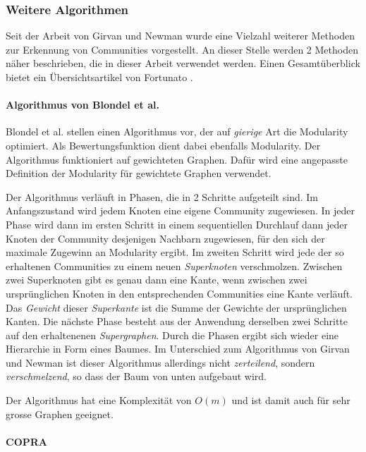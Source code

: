 \subsubsection{Weitere Algorithmen}
\label{sec:algorithmen}

Seit der Arbeit von Girvan und Newman wurde eine Vielzahl weiterer
Methoden zur Erkennung von Communities vorgestellt. An dieser Stelle
werden 2 Methoden n\"aher beschrieben, die in dieser Arbeit verwendet
werden. Einen Gesamt\"uberblick bietet ein \"Ubersichtsartikel von
Fortunato \cite{Fortunato2010}.

\paragraph{Algorithmus von Blondel et al.}
\label{sec:algor-von-blond}

Blondel et al.\cite{Blondel2008} stellen einen Algorithmus vor, der
auf \emph{gierige} Art die Modularity optimiert.  Als
Bewertungsfunktion dient dabei ebenfalls Modularity. Der Algorithmus
funktioniert auf gewichteten Graphen. Daf\"ur wird eine angepasste
Definition der Modularity f\"ur gewichtete Graphen
verwendet\cite{Newman2004a}.

Der Algorithmus verl\"auft in Phasen, die in 2 Schritte aufgeteilt
sind. Im Anfangszustand wird jedem Knoten eine eigene Community
zugewiesen. In jeder Phase wird dann im ersten Schritt in einem
sequentiellen Durchlauf dann jeder Knoten der Community desjenigen
Nachbarn zugewiesen, f\"ur den sich der maximale Zugewinn an
Modularity ergibt. Im zweiten Schritt wird jede der so erhaltenen
Communities zu einem neuen \emph{Superknoten} verschmolzen. Zwischen
zwei Superknoten gibt es genau dann eine Kante, wenn zwischen zwei
urspr\"unglichen Knoten in den entsprechenden Communities eine Kante
verl\"auft. Das \emph{Gewicht} dieser \emph{Superkante} ist die Summe
der Gewichte der urspr\"unglichen Kanten. Die n\"achste Phase besteht
aus der Anwendung derselben zwei Schritte auf den erhaltenenen
\emph{Supergraphen}. Durch die Phasen ergibt sich wieder eine
Hierarchie in Form eines Baumes. Im Unterschied zum Algorithmus von
Girvan und Newman ist dieser Algorithmus allerdings nicht
\emph{zerteilend}, sondern \emph{verschmelzend}, so dass der Baum von
unten aufgebaut wird.

Der Algorithmus hat eine Komplexit\"at von $O(m)$ und ist damit auch
f\"ur sehr grosse Graphen geeignet.

\paragraph{COPRA}
\label{sec:copra}

